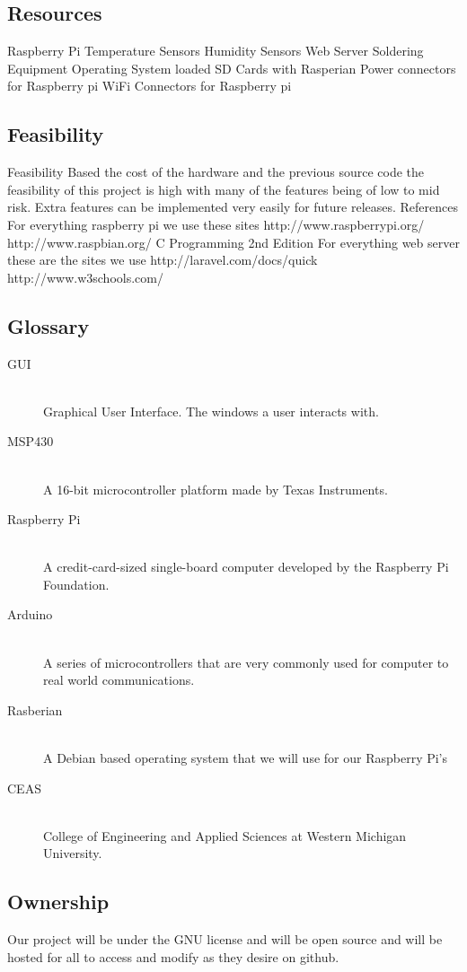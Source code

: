 \documentclass{report}
\begin{document}
\subsection*{Resources}
Raspberry Pi
Temperature Sensors
Humidity Sensors
Web Server
Soldering Equipment
Operating System loaded SD Cards with Rasperian
Power connectors for Raspberry pi
WiFi Connectors for Raspberry pi
\newpage
\subsection*{Feasibility}
Feasibility
	Based the cost of the hardware and the previous source code the feasibility of this project is high with many of the features being of low to mid risk. Extra features can be implemented very easily for future releases.
References
	For everything raspberry pi we use these sites
http://www.raspberrypi.org/
http://www.raspbian.org/
C Programming 2nd Edition
For everything web server these are the sites we use
	http://laravel.com/docs/quick
http://www.w3schools.com/
\newpage
\subsection*{Glossary}
\begin{description}
\item [GUI] \hfill \\
Graphical User Interface. The windows a user interacts with.
\item [MSP430] \hfill \\
A 16-bit microcontroller platform made by Texas Instruments.
\item [Raspberry Pi] \hfill \\
 A credit-card-sized single-board computer developed by the Raspberry Pi Foundation.
\item [Arduino] \hfill \\
A series of microcontrollers that are very commonly used for computer to real world communications.
\item [Rasberian] \hfill \\
 A Debian based operating system that we will use for our Raspberry Pi’s
\item [CEAS] \hfill \\
College of Engineering and Applied Sciences at Western Michigan University.
\end{description}
\newpage
\subsection*{Ownership}
	Our project will be under the GNU license and will be open source and will be hosted for all to access and modify as they desire on github.
\end{document}
